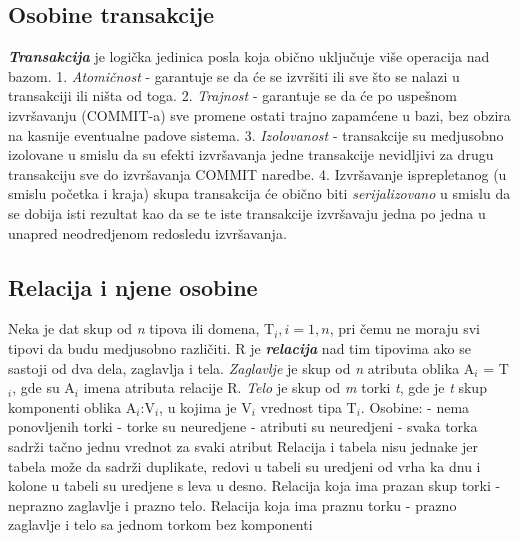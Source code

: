 \documentclass{article}
\begin{document}
\subsection{Osobine transakcije}
\textit{\textbf{Transakcija}} je logička jedinica posla koja obično
uključuje više operacija nad bazom. \newline \hspace*{0.2cm}
1. \textit{Atomičnost} - garantuje se da će se izvršiti ili sve što se
nalazi u transakciji ili ništa od toga.
\newline \hspace*{0.2cm}
2. \textit{Trajnost} - garantuje se da će po uspešnom izvršavanju
(COMMIT-a) sve promene ostati trajno zapamćene u bazi, bez obzira na
kasnije eventualne padove sistema.
\newline \hspace*{0.2cm}
3. \textit{Izolovanost} - transakcije su medjusobno izolovane u smislu
da su efekti izvršavanja jedne transakcije nevidljivi za drugu
transakciju sve do izvršavanja COMMIT naredbe.
\newline \hspace*{0.2cm}
4. Izvršavanje isprepletanog (u smislu početka i kraja) skupa
transakcija će obično biti \textit{serijalizovano} u smislu da se
dobija isti rezultat kao da se te iste transakcije izvršavaju jedna po
jedna u unapred neodredjenom redosledu izvršavanja.

\subsection{Relacija i njene osobine}
Neka je dat skup od \textit{n} tipova ili domena, T$_i, i={1, n}$, 
pri čemu ne moraju svi tipovi da budu medjusobno različiti. R je 
\textit{\textbf{relacija}} nad tim tipovima ako se sastoji od 
dva dela, zaglavlja i tela. \textit{Zaglavlje} je skup od 
\textit{n} atributa oblika A$_i$ = T$_i$, gde su A$_i$ imena atributa
relacije R. \textit{Telo} je skup od \textit{m} torki \textit{t}, gde
je \textit{t} skup komponenti oblika A$_i$:V$_i$, u kojima je V$_i$
vrednost tipa T$_i$. \newline
Osobine:
\newline \hspace*{0.2cm}- nema ponovljenih torki
\newline \hspace*{0.2cm}- torke su neuredjene
\newline \hspace*{0.2cm}- atributi su neuredjeni
\newline \hspace*{0.2cm}- svaka torka sadrži tačno jednu vrednot za svaki atribut
\vspace{0.2cm}\newline
Relacija i tabela nisu jednake jer tabela može da sadrži duplikate, 
redovi u tabeli su uredjeni od vrha ka dnu i kolone u tabeli su
uredjene s leva u desno.
\newline
Relacija koja ima prazan skup torki - neprazno zaglavlje i prazno telo.
Relacija koja ima praznu torku - prazno zaglavlje i telo sa jednom
torkom bez komponenti
\end{document}
